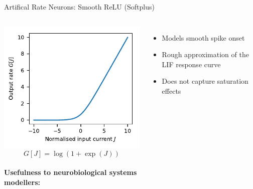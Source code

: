 \documentclass[handout,aspectratio=169]{beamer}
\begin{document}
\begin{frame}{Artifical Rate Neurons: Smooth ReLU (Softplus)}
	\begin{columns}
	\includegraphics[width=\textwidth]{media/nonlinearity_smooth_relu.pdf}%
	$$G[J] = \log(1 + \exp(J))$$\\[0.5cm]
	\textbf{Usefulness to neurobiological systems\\modellers:}
	\begin{itemize}
		\item[\OPlus] Models smooth spike onset
		\item[\OMeh] Rough approximation of the LIF response curve
		\item[\OMinus] Does not capture saturation effects
	\end{itemize}
	\end{columns}	
\end{frame}
\end{document}
